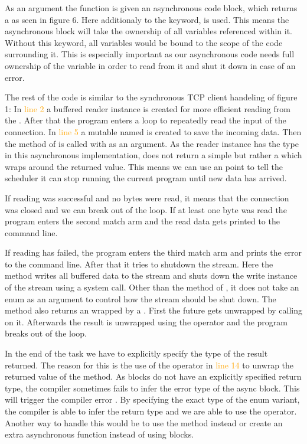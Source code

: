 As an argument the function is given an asynchronous code block, which returns a  as seen in figure 6.
Here additionaly to the  keyword,  is used. This means the asynchronous block will take the
ownership of all variables referenced within it. Without this keyword, all variables would be bound to the scope of the
code surrounding it. This is especially important as our asynchronous code needs full ownership of the 
variable in order to read from it and shut it down in case of an error.

The rest of the code is similar to the synchronous TCP client handeling of figure 1: In \textcolor{orange}{line 2} a
buffered reader instance is created for more efficient reading from the . After that the program enters
a loop to repeatedly read the input of the connection. In \textcolor{orange}{line 5} a mutable  named
 is created to save the incoming data. Then the method  of  is called with
 as an argument. As the reader instance has the type  in this asynchronous
implementation,  does not return a simple  but rather a  which wraps around
the returned value. This means we can use an  point to tell the scheduler it can stop running the current
program until new data has arrived.

If reading was successful and no bytes were read, it means that the connection was closed and we can break out of the
loop. If at least one byte was read the program enters the second match arm and the read data gets printed to the
command line.

If reading has failed, the program enters the third match arm and prints the error to the command line. After that it
tries to shutdown the stream. Here the  method writes all buffered data to the stream and shuts down the
write instance of the stream using a system call. Other than the  method of ,
it does not take an enum as an argument to control how the stream should be shut down. The method also returns an
 wrapped by a . First the future gets unwrapped by calling  on it. Afterwards the
result is unwrapped using the  operator and the program breaks out of the loop.

In the end of the task we have to explicitly specify the type of the result returned. The reason for this is the use of
the  operator in \textcolor{orange}{line 14} to unwrap the returned value of the  method. As
 blocks do not have an explicitly specified return type, the compiler sometimes fails to infer the error
type of the async block. This will trigger the compiler error . By specifying the
exact type of the  enum variant, the compiler is able to infer the return type and we are able to use the
 operator. Another way to handle this would be to use the  method instead or create an extra
asynchronous function instead of using  blocks. \cite{async-rust}

